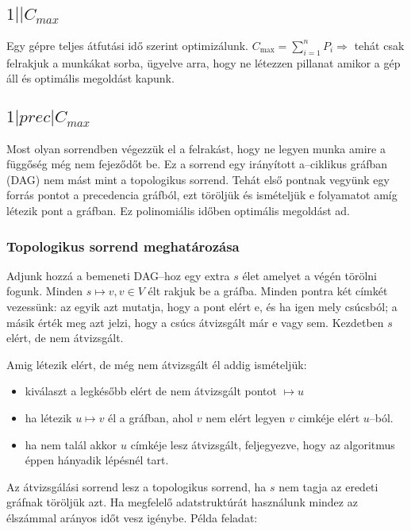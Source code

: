 \subsection{ \texorpdfstring {$ 1||C_{max} $} {1||Cmax} }

Egy gépre teljes átfutási idő szerint optimizálunk. $C_{\mbox{max}}=\sum_{i=1}^{n}
P_i \Rightarrow$ tehát csak felrakjuk a munkákat sorba, ügyelve arra, hogy ne 
létezzen pillanat amikor a gép áll és optimális megoldást kapunk.

\subsection{ \texorpdfstring {$ 1|prec|C_{max} $} {1|prec|Cmax} }

Most olyan sorrendben végezzük el a felrakást, hogy ne legyen munka amire a
függőség még nem fejeződőt be. Ez a sorrend egy irányított a--ciklikus gráfban
(DAG) nem mást mint a topologikus sorrend. Tehát első pontnak vegyünk egy forrás
pontot a precedencia gráfból, ezt töröljük és ismételjük e folyamatot amíg
létezik pont a gráfban. Ez polinomiális időben optimális megoldást ad.

\subsubsection{Topologikus sorrend meghatározása}

Adjunk hozzá a bemeneti DAG--hoz egy extra $s$ élet amelyet a végén törölni
fogunk. Minden $s \mapsto v, v \in V$ élt rakjuk be a gráfba. Minden pontra két
címkét vezessünk: az egyik azt mutatja, hogy a pont elért e, és ha igen mely
csúcsból; a másik érték meg azt jelzi, hogy a csúcs átvizsgált már e vagy sem.
Kezdetben $s$ elért, de nem átvizsgált.

Amig létezik elért, de még nem átvizsgált él addig ismételjük: 

\begin{itemize}
  \item kiválaszt a legkésőbb elért de nem átvizsgált pontot $\mapsto u$
  \item ha létezik $u \mapsto v$ él a gráfban, ahol $v$ nem elért legyen $v$
  cimkéje elért $u$--ból.
  \item ha nem talál akkor $u$ címkéje lesz átvizsgált, feljegyezve, hogy az 
  algoritmus éppen hányadik lépésnél tart.
\end{itemize}

Az átvizsgálási sorrend lesz a topologikus sorrend, ha $s$ nem tagja az eredeti
gráfnak töröljük azt. Ha megfelelő adatstruktúrát használunk mindez az élszámmal
arányos időt vesz igénybe. Példa feladat:


